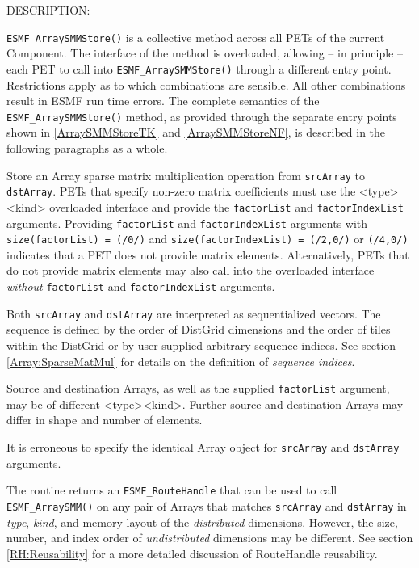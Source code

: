 {\sf DESCRIPTION:\\ }


   \label{ArraySMMStoreTK}
   {\tt ESMF\_ArraySMMStore()} is a collective method across all PETs of the
   current Component. The interface of the method is overloaded, allowing 
   -- in principle -- each PET to call into {\tt ESMF\_ArraySMMStore()}
   through a different entry point. Restrictions apply as to which combinations
   are sensible. All other combinations result in ESMF run time errors. The
   complete semantics of the {\tt ESMF\_ArraySMMStore()} method, as provided
   through the separate entry points shown in \ref{ArraySMMStoreTK} and
   \ref{ArraySMMStoreNF}, is described in the following paragraphs as a whole.
  
     \begin{sloppypar}
     Store an Array sparse matrix multiplication operation from {\tt srcArray}
     to {\tt dstArray}. PETs that specify non-zero matrix coefficients must use
     the <type><kind> overloaded interface and provide the {\tt factorList} and
     {\tt factorIndexList} arguments. Providing {\tt factorList} and
     {\tt factorIndexList} arguments with {\tt size(factorList) = (/0/)} and
     {\tt size(factorIndexList) = (/2,0/)} or {\tt (/4,0/)} indicates that a 
     PET does not provide matrix elements. Alternatively, PETs that do not 
     provide matrix elements may also call into the overloaded interface
     {\em without} {\tt factorList} and {\tt factorIndexList} arguments.
     \end{sloppypar}
  
     Both {\tt srcArray} and {\tt dstArray} are interpreted as sequentialized
     vectors. The sequence is defined by the order of DistGrid dimensions and 
     the order of tiles within the DistGrid or by user-supplied arbitrary
     sequence indices. See section \ref{Array:SparseMatMul} for details on the
     definition of {\em sequence indices}.
  
     Source and destination Arrays, as well as the supplied {\tt factorList}
     argument, may be of different <type><kind>. Further source and
     destination Arrays may differ in shape and number of elements.
  
     It is erroneous to specify the identical Array object for {\tt srcArray} and
     {\tt dstArray} arguments.
  
     The routine returns an {\tt ESMF\_RouteHandle} that can be used to call 
     {\tt ESMF\_ArraySMM()} on any pair of Arrays that matches 
     {\tt srcArray} and {\tt dstArray} in {\em type}, {\em kind}, and 
     memory layout of the {\em distributed} dimensions. However, the size,
     number, and index order of {\em undistributed} dimensions may be different.
     See section \ref{RH:Reusability} for a more detailed discussion of 
     RouteHandle reusability.
  
